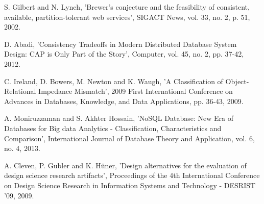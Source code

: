 \begin{thebibliography}{69}



 S.  Gilbert and N.  Lynch, 'Brewer's conjecture and the feasibility of consistent, available, partition-tolerant web services', SIGACT News, vol. 33, no. 2, p. 51, 2002.

 D.  Abadi, 'Consistency Tradeoffs in Modern Distributed Database System Design: CAP is Only Part of the Story', Computer, vol. 45, no. 2, pp. 37-42, 2012.



 C.  Ireland, D.  Bowers, M.  Newton and K.  Waugh, 'A Classification of Object-Relational Impedance Mismatch', 2009 First International Conference on Advances in Databases, Knowledge, and Data Applications, pp. 36-43, 2009.


 A. Moniruzzaman and S. Akhter Hossain, 'NoSQL Database: New Era of Databases for Big data Analytics - Classification, Characteristics and Comparison', International Journal of Database Theory and Application, vol. 6, no. 4, 2013.

 A.  Cleven, P.  Gubler and K.  Hüner, 'Design alternatives for the evaluation of design science research artifacts', Proceedings of the 4th International Conference on Design Science Research in Information Systems and Technology - DESRIST '09, 2009.


\end{thebibliography}
